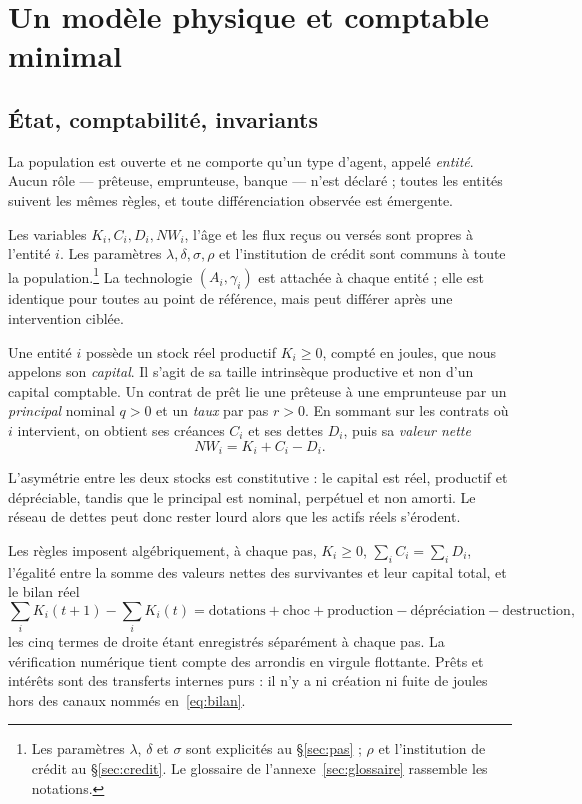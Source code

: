 \section{Un modèle physique et comptable minimal}\label{sec:modele}


\subsection{État, comptabilité, invariants}

La population est ouverte et ne comporte qu'un type d'agent, appelé
\emph{entité}. Aucun rôle --- prêteuse, emprunteuse, banque --- n'est déclaré ;
toutes les entités suivent les mêmes règles, et toute différenciation observée
est émergente.

Les variables $K_i,C_i,D_i,NW_i$, l'âge et les flux reçus ou versés sont
propres à l'entité $i$. Les paramètres $\lambda,\delta,\sigma,\rho$ et
l'institution de crédit sont communs à toute la population.\footnote{Les
paramètres $\lambda$, $\delta$ et $\sigma$ sont explicités au
§\ref{sec:pas} ; $\rho$ et l'institution de crédit au §\ref{sec:credit}.
Le glossaire de l'annexe~\ref{sec:glossaire} rassemble les notations.} La technologie
$(A_i,\gamma_i)$ est attachée à chaque entité ; elle est identique pour toutes
au point de référence, mais peut différer après une intervention ciblée.

Une entité $i$ possède un stock réel productif $K_i \ge 0$, compté en joules,
que nous appelons son \emph{capital}. Il s'agit de sa taille intrinsèque
productive et non d'un capital comptable. Un contrat de prêt lie une prêteuse
à une emprunteuse par un \emph{principal} nominal $q > 0$ et un \emph{taux}
par pas $r > 0$. En sommant sur les contrats où $i$ intervient, on obtient ses
créances $C_i$ et ses dettes $D_i$, puis sa \emph{valeur nette}
\begin{equation}
NW_i = K_i + C_i - D_i .
\label{eq:nw}
\end{equation}

L'asymétrie entre les deux stocks est constitutive : le capital est réel,
productif et dépréciable, tandis que le principal est nominal, perpétuel et
non amorti. Le réseau de dettes peut donc rester lourd alors que les actifs
réels s'érodent.

Les règles imposent algébriquement, à chaque pas, $K_i \ge 0$,
$\sum_i C_i = \sum_i D_i$, l'égalité entre la somme des valeurs nettes des
survivantes et leur capital total, et le bilan réel
\begin{equation}
\sum_i K_i(t{+}1) - \sum_i K_i(t) = \text{dotations} + \text{choc}
  + \text{production} - \text{dépréciation} - \text{destruction},
\label{eq:bilan}
\end{equation}
les cinq termes de droite étant enregistrés séparément à chaque pas.
La vérification numérique tient compte des arrondis en virgule flottante.
Prêts et intérêts sont des transferts internes purs : il n'y a ni création ni
fuite de joules hors des canaux nommés en~\eqref{eq:bilan}.

